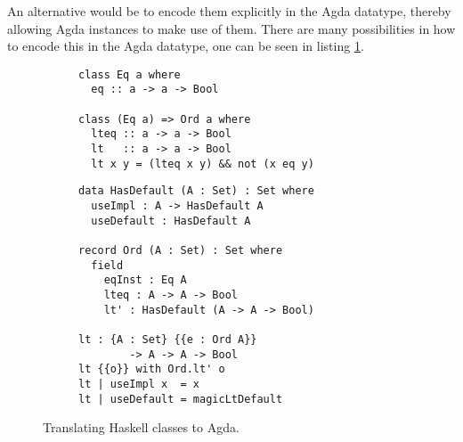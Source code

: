 \documentclass[12pt, a4paper, twoside]{report}
\begin{document}
An alternative would be to encode them explicitly in the Agda datatype, thereby
allowing Agda instances to make use of them. There are many possibilities in
how to encode this in the Agda datatype, one can be seen in listing \ref{lst:cls-hs-agda}.
\begin{figure}
\begin{subfigure}[b]{0.5\textwidth}
\begin{lstlisting}
class Eq a where
  eq :: a -> a -> Bool

class (Eq a) => Ord a where
  lteq :: a -> a -> Bool
  lt   :: a -> a -> Bool
  lt x y = (lteq x y) && not (x eq y)
\end{lstlisting}
\end{subfigure}
\hspace{10pt}
\begin{subfigure}[b]{0.5\textwidth}
\begin{lstlisting}
data HasDefault (A : Set) : Set where
  useImpl : A -> HasDefault A
  useDefault : HasDefault A

record Ord (A : Set) : Set where
  field
    eqInst : Eq A
    lteq : A -> A -> Bool
    lt' : HasDefault (A -> A -> Bool)

lt : {A : Set} {{e : Ord A}}
        -> A -> A -> Bool
lt {{o}} with Ord.lt' o
lt | useImpl x  = x
lt | useDefault = magicLtDefault
\end{lstlisting}
\end{subfigure}
\caption{Translating Haskell classes to Agda.}
\label{lst:cls-hs-agda}
\end{figure}
\end{document}
